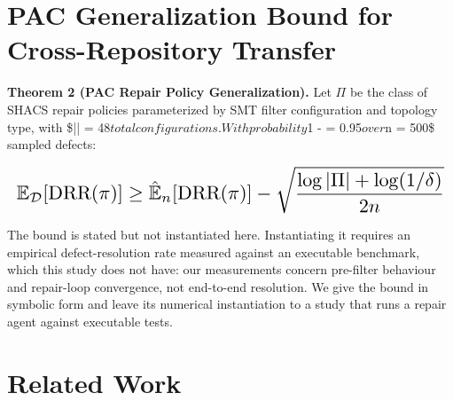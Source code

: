 \documentclass[10pt,twocolumn,letterpaper]{article}
\begin{document}
\section{PAC Generalization Bound for Cross-Repository Transfer}


\textbf{Theorem 2 (PAC Repair Policy Generalization).} Let $\Pi$ be the class of SHACS repair policies parameterized by SMT filter configuration and topology type, with \$|\Pi| = 48$ total configurations. With probability $1 - \delta = 0.95$ over $n = 500\$ sampled defects:
























\begin{equation}
\resizebox{\columnwidth}{!}{$\displaystyle
\begin{aligned}
\mathbb{E}_{\mathcal{D}}[\text{DRR}(\pi)] \geq \hat{\mathbb{E}}_n[\text{DRR}(\pi)] - \sqrt{\frac{\log|\Pi| + \log(1/\delta)}{2n}}
\end{aligned}
$}
\end{equation}
























The bound is stated but not instantiated here. Instantiating it requires an empirical defect-resolution rate measured against an executable benchmark, which this study does not have: our measurements concern pre-filter behaviour and repair-loop convergence, not end-to-end resolution. We give the bound in symbolic form and leave its numerical instantiation to a study that runs a repair agent against executable tests.




\section{Related Work}
\end{document}
